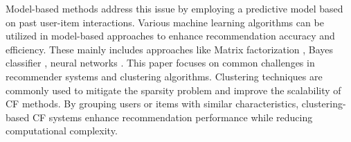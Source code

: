 \documentclass{article}
\theoremstyle{plain}
\theoremstyle{definition}
\theoremstyle{remark}
\begin{document}
Model-based methods address this issue by employing a predictive model  based on past user-item interactions. Various machine learning algorithms can be utilized in model-based approaches to enhance recommendation accuracy and efficiency. These mainly includes approaches like Matrix factorization \cite{isinkaye2023matrix,shi2020user,yang2018enhancing, behera2023mixed}, Bayes classifier \cite{valdiviezo2019collaborative}, neural networks \cite{wang2015collaborative,angel2022deep,li2017collaborative}.
This paper focuses on common challenges in recommender systems and clustering algorithms. Clustering techniques are commonly used to mitigate the sparsity problem and improve the scalability of CF methods. By grouping users or items with similar characteristics, clustering-based CF systems enhance recommendation performance while reducing computational complexity. 
\end{document}
